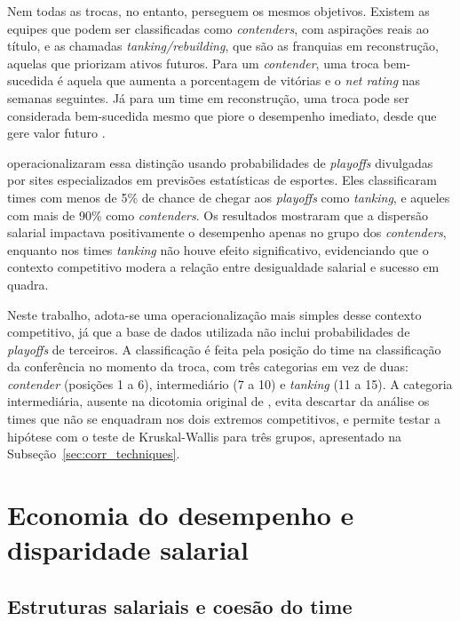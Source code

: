 Nem todas as trocas, no entanto, perseguem os mesmos objetivos. Existem as equipes que podem ser classificadas como \textit{contenders}, com aspirações reais ao título, e as chamadas \textit{tanking/rebuilding}, que são as franquias em reconstrução, aquelas que priorizam ativos futuros. Para um \textit{contender}, uma troca bem-sucedida é aquela que aumenta a porcentagem de vitórias e o \textit{net rating} nas semanas seguintes. Já para um time em reconstrução, uma troca pode ser considerada bem-sucedida mesmo que piore o desempenho imediato, desde que gere valor futuro \citep{zimbalist2003}.

\citet{katayama2011} operacionalizaram essa distinção usando probabilidades de \textit{playoffs} divulgadas por sites especializados em previsões estatísticas de esportes. Eles classificaram times com menos de 5\% de chance de chegar aos \textit{playoffs} como \textit{tanking}, e aqueles com mais de 90\% como \textit{contenders}. Os resultados mostraram que a dispersão salarial impactava positivamente o desempenho apenas no grupo dos \textit{contenders}, enquanto nos times \textit{tanking} não houve efeito significativo, evidenciando que o contexto competitivo modera a relação entre desigualdade salarial e sucesso em quadra.

Neste trabalho, adota-se uma operacionalização mais simples desse contexto competitivo, já que a base de dados utilizada não inclui probabilidades de \textit{playoffs} de terceiros. A classificação é feita pela posição do time na classificação da conferência no momento da troca, com três categorias em vez de duas: \textit{contender} (posições 1 a 6), intermediário (7 a 10) e \textit{tanking} (11 a 15). A categoria intermediária, ausente na dicotomia original de \citet{katayama2011}, evita descartar da análise os times que não se enquadram nos dois extremos competitivos, e permite testar a hipótese com o teste de Kruskal-Wallis para três grupos, apresentado na Subseção~\ref{sec:corr_techniques}.

\section{Economia do desempenho e disparidade salarial}
\label{sec:salary_economy}

\subsection{Estruturas salariais e coesão do time}
\label{sec:wage_structures}

